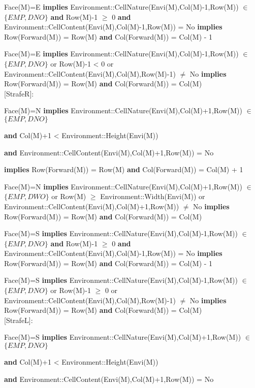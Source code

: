 \documentclass[11pt]{article}
\begin{document}
Face(M)=E \textbf{implies} Environment::CellNature(Envi(M),Col(M)-1,Row(M)) $\in$ $\{EMP, DNO\}$
\textbf{and} Row(M)-1 $\geq$ 0
\textbf{and} Environment::CellContent(Envi(M),Col(M)-1,Row(M)) = No
\textbf{implies} Row(Forward(M)) = Row(M)
\textbf{and} Col(Forward(M)) = Col(M) - 1

Face(M)=E \textbf{implies}
Environment::CellNature(Envi(M),Col(M)-1,Row(M)) $\in$
$\{EMP, DNO\}$
or Row(M)-1 < 0
or Environment::CellContent(Envi(M),Col(M),Row(M)-1) $\neq$ No
\textbf{implies} Row(Forward(M)) = Row(M)
\textbf{and} Col(Forward(M)) = Col(M)\\




[StrafeR]:

Face(M)=N \textbf{implies}
Environment::CellNature(Envi(M),Col(M)+1,Row(M)) $\in$ $\{EMP, DNO\}$

\textbf{and} Col(M)+1 < Environment::Height(Envi(M))

\textbf{and} Environment::CellContent(Envi(M),Col(M)+1,Row(M)) = No

\textbf{implies} Row(Forward(M)) = Row(M) \textbf{and} Col(Forward(M)) = Col(M) + 1

Face(M)=N \textbf{implies}
Environment::CellNature(Envi(M),Col(M)+1,Row(M)) $\in$ $\{EMP, DWO\}$
or Row(M) $\geq$ Environment::Width(Envi(M))
or Environment::CellContent(Envi(M),Col(M)+1,Row(M)) $\neq$ No
\textbf{implies} Row(Forward(M)) = Row(M)
\textbf{and} Col(Forward(M)) = Col(M)

Face(M)=S \textbf{implies} Environment::CellNature(Envi(M),Col(M)-1,Row(M)) $\in$ $\{EMP, DNO\}$
\textbf{and} Row(M)-1 $\geq$ 0
\textbf{and} Environment::CellContent(Envi(M),Col(M)-1,Row(M)) = No
\textbf{implies} Row(Forward(M)) = Row(M)
\textbf{and} Col(Forward(M)) = Col(M) - 1

Face(M)=S \textbf{implies}
Environment::CellNature(Envi(M),Col(M)-1,Row(M)) $\in$
$\{EMP, DNO\}$
or Row(M)-1 $\geq$ 0
or Environment::CellContent(Envi(M),Col(M),Row(M)-1) $\neq$ No
\textbf{implies} Row(Forward(M)) = Row(M)
\textbf{and} Col(Forward(M)) = Col(M)\\

[StrafeL]:

Face(M)=S \textbf{implies}
Environment::CellNature(Envi(M),Col(M)+1,Row(M)) $\in$ $\{EMP, DNO\}$

\textbf{and} Col(M)+1 < Environment::Height(Envi(M))

\textbf{and} Environment::CellContent(Envi(M),Col(M)+1,Row(M)) = No
\end{document}
